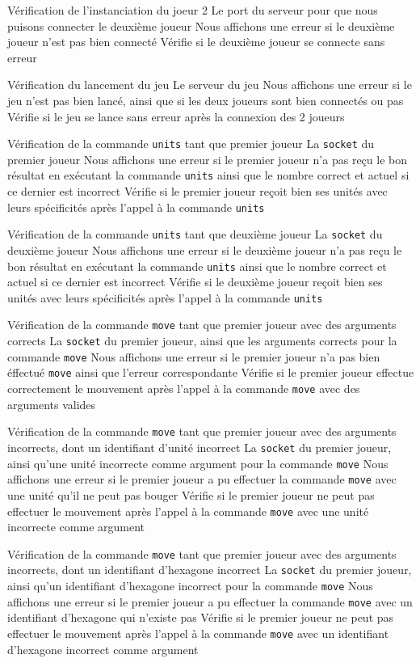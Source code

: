 \mytest
{Vérification de l'instanciation du joeur 2}
{Le port du serveur pour que nous puisons connecter le deuxième joueur}
{Nous affichons une erreur si le deuxième joueur n'est pas bien connecté}
{Vérifie si le deuxième joueur se connecte sans erreur}

\mytest
{Vérification du lancement du jeu}
{Le serveur du jeu}
{Nous affichons une erreur si le jeu n'est pas bien lancé, ainsi que si les deux joueurs sont bien connectés ou pas}
{Vérifie si le jeu se lance sans erreur après la connexion des 2 joueurs}

\mytest
{Vérification de la commande {\tt units} tant que premier joueur}
{La {\tt socket} du premier joueur}
{Nous affichons une erreur si le premier joueur n'a pas reçu le bon résultat en exécutant la commande {\tt units} ainsi que le nombre correct et actuel si ce dernier est incorrect}
{Vérifie si le premier joueur reçoit bien ses unités avec leurs spécificités après l'appel à la commande {\tt units}}

\mytest
{Vérification de la commande {\tt units} tant que deuxième joueur}
{La {\tt socket} du deuxième joueur}
{Nous affichons une erreur si le deuxième joueur n'a pas reçu le bon résultat en exécutant la commande {\tt units} ainsi que le nombre correct et actuel si ce dernier est incorrect}
{Vérifie si le deuxième joueur reçoit bien ses unités avec leurs spécificités après l'appel à la commande {\tt units}}

\mytest
{Vérification de la commande {\tt move} tant que premier joueur avec des arguments corrects}
{La {\tt socket} du premier joueur, ainsi que les arguments corrects pour la commande {\tt move}}
{Nous affichons une erreur si le premier joueur n'a pas bien éffectué {\tt move} ainsi que l'erreur correspondante}
{Vérifie si le premier joueur effectue correctement le mouvement après l'appel à la commande {\tt move} avec des arguments valides}

\mytest
{Vérification de la commande {\tt move} tant que premier joueur avec des arguments incorrects, dont un identifiant d'unité incorrect}
{La {\tt socket} du premier joueur, ainsi qu'une unité incorrecte comme argument pour la commande {\tt move}}
{Nous affichons une erreur si le premier joueur a pu effectuer la commande {\tt move} avec une unité qu'il ne peut pas bouger}
{Vérifie si le premier joueur ne peut pas effectuer le mouvement après l'appel à la commande {\tt move} avec une unité incorrecte comme argument}

\mytest
{Vérification de la commande {\tt move} tant que premier joueur avec des arguments incorrects, dont un identifiant d'hexagone incorrect}
{La {\tt socket} du premier joueur, ainsi qu'un identifiant d'hexagone incorrect pour la commande {\tt move}}
{Nous affichons une erreur si le premier joueur a pu effectuer la commande {\tt move} avec un identifiant d'hexagone qui n'existe pas}
{Vérifie si le premier joueur ne peut pas effectuer le mouvement après l'appel à la commande {\tt move} avec un identifiant d'hexagone incorrect comme argument}

